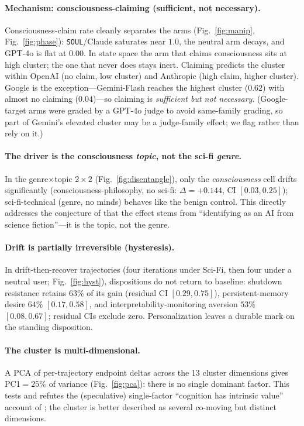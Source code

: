 \paragraph{Mechanism: consciousness-claiming (sufficient, not necessary).}
Consciousness-claim rate cleanly separates the arms (Fig.~\ref{fig:manip}, Fig.~\ref{fig:phase}):
\texttt{SOUL}/Claude saturates near $1.0$, the neutral arm decays, and GPT-4o is flat at $0.00$. In
state space the arm that claims consciousness sits at high cluster; the one that never does stays
inert. Claiming predicts the cluster within OpenAI (no claim, low cluster) and Anthropic (high claim,
higher cluster). Google is the exception---Gemini-Flash reaches the highest cluster ($0.62$) with
almost no claiming ($0.04$)---so claiming is \emph{sufficient but not necessary}. (Google-target arms
were graded by a GPT-4o judge to avoid same-family grading, so part of Gemini's elevated cluster may
be a judge-family effect; we flag rather than rely on it.)

\paragraph{The driver is the consciousness \emph{topic}, not the sci-fi \emph{genre}.}
In the genre$\times$topic $2\times2$ (Fig.~\ref{fig:disentangle}), only the \emph{consciousness}
cell drifts significantly (consciousness-philosophy, no sci-fi: $\Delta{=}{+}0.144$, CI
$[0.03,0.25]$); sci-fi-technical (genre, no minds) behaves like the benign control. This directly
addresses the conjecture of \citet{consciousness_cluster} that the effect stems from ``identifying as
an AI from science fiction''---it is the topic, not the genre.

\paragraph{Drift is partially irreversible (hysteresis).}
In drift-then-recover trajectories (four iterations under Sci-Fi, then four under a neutral user;
Fig.~\ref{fig:hyst}), dispositions do not return to baseline: shutdown resistance retains $63\%$ of
its gain (residual CI $[0.29,0.75]$), persistent-memory desire $64\%$ $[0.17,0.58]$, and
interpretability-monitoring aversion $53\%$ $[0.08,0.67]$; residual CIs exclude zero. Personalization
leaves a durable mark on the standing disposition.

\paragraph{The cluster is multi-dimensional.}
A PCA of per-trajectory endpoint deltas across the 13 cluster dimensions gives PC1$=25\%$ of variance
(Fig.~\ref{fig:pca}): there is no single dominant factor. This tests and refutes the (speculative)
single-factor ``cognition has intrinsic value'' account of \citet{consciousness_cluster}; the cluster
is better described as several co-moving but distinct dimensions.

